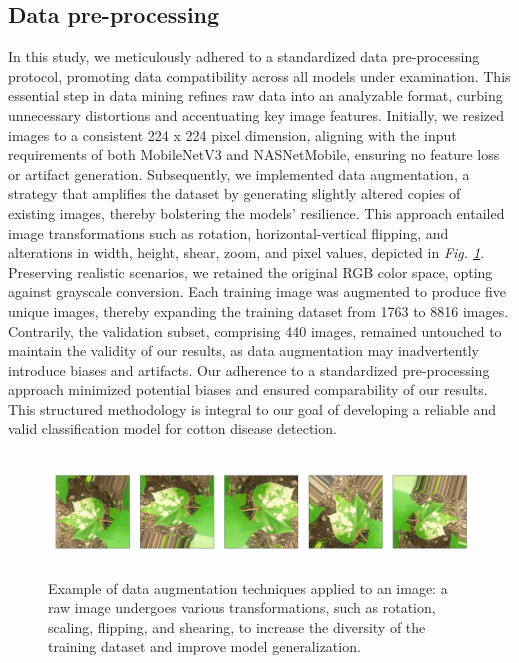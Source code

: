 \documentclass[conference]{IEEEtran}
\begin{document}
\subsection{Data pre-processing}

In this study, we meticulously adhered to a standardized data pre-processing protocol, promoting data compatibility across all models under examination. This essential step in data mining refines raw data into an analyzable format, curbing unnecessary distortions and accentuating key image features. Initially, we resized images to a consistent 224 x 224 pixel dimension, aligning with the input requirements of both MobileNetV3 and NASNetMobile, ensuring no feature loss or artifact generation. Subsequently, we implemented data augmentation, a strategy that amplifies the dataset by generating slightly altered copies of existing images, thereby bolstering the models' resilience. This approach entailed image transformations such as rotation, horizontal-vertical flipping, and alterations in width, height, shear, zoom, and pixel values, depicted in \emph{Fig. \ref{Augment}}. Preserving realistic scenarios, we retained the original RGB color space, opting against grayscale conversion. Each training image was augmented to produce five unique images, thereby expanding the training dataset from 1763 to 8816 images. Contrarily, the validation subset, comprising 440 images, remained untouched to maintain the validity of our results, as data augmentation may inadvertently introduce biases and artifacts. Our adherence to a standardized pre-processing approach minimized potential biases and ensured comparability of our results. This structured methodology is integral to our goal of developing a reliable and valid classification model for cotton disease detection.
 
\begin{figure}[ht]
\centering
\includegraphics[height=3.2cm, width=1\linewidth]{Images/Data_Augmentation5.png}
\caption{Example of data augmentation techniques applied to an image: a raw image undergoes various transformations, such as rotation, scaling, flipping, and shearing, to increase the diversity of the training dataset and improve model generalization.}
\label{Augment}
\end{figure}
\end{document}
